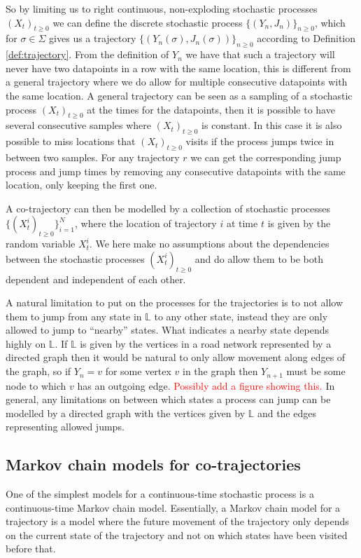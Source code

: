\documentclass[12pt]{article}
\newcommand{\todo}[1]{\textcolor{red}{#1}}
\newcommand{\traj}{r}
\newcommand{\locset}{\mathbb{L}}
\theoremstyle{definition}
\begin{document}
So by limiting us to right continuous, non-exploding stochastic
processes \((X_{t})_{t \geq 0}\) we can define the discrete stochastic
process \(\{(Y_{n}, J_{n})\}_{n \geq 0}\), which for
\(\sigma \in \Sigma\) gives us a trajectory
\(\{(Y_{n}(\sigma), J_{n}(\sigma))\}_{n \geq 0}\) according to
Definition \ref{def:trajectory}. From the definition of \(Y_{n}\) we
have that such a trajectory will never have two datapoints in a row
with the same location, this is different from a general trajectory
where we do allow for multiple consecutive datapoints with the same
location. A general trajectory can be seen as a sampling of a
stochastic process \((X_{t})_{t \geq 0}\) at the times for the
datapoints, then it is possible to have several consecutive samples
where \((X_{t})_{t \geq 0}\) is constant. In this case it is also
possible to miss locations that \((X_{t})_{t \geq 0}\) visits if the
process jumps twice in between two samples. For any trajectory
\(\traj\) we can get the corresponding jump process and jump times by
removing any consecutive datapoints with the same location, only
keeping the first one.

A co-trajectory can then be modelled by a collection of stochastic
processes \(\{(X_{t}^{i})_{t \geq 0}\}_{i = 1}^{N}\), where the
location of trajectory \(i\) at time \(t\) is given by the random
variable \(X_{t}^{i}\). We here make no assumptions about the
dependencies between the stochastic processes
\((X_{t}^{i})_{t \geq 0}\) and do allow them to be both dependent and
independent of each other.

A natural limitation to put on the processes for the trajectories is
to not allow them to jump from any state in \(\locset\) to any other
state, instead they are only allowed to jump to ``nearby'' states.
What indicates a nearby state depends highly on \(\locset\). If
\(\locset\) is given by the vertices in a road network represented by
a directed graph then it would be natural to only allow movement along
edges of the graph, so if \(Y_{n} = v\) for some vertex \(v\) in the
graph then \(Y_{n + 1}\) must be some node to which \(v\) has an
outgoing edge. \todo{Possibly add a figure showing this.} In general,
any limitations on between which states a process can jump can be
modelled by a directed graph with the vertices given by \(\locset\)
and the edges representing allowed jumps.

\subsection{Markov chain models for co-trajectories}
One of the simplest models for a continuous-time stochastic process is
a continuous-time Markov chain model. Essentially, a Markov chain
model for a trajectory is a model where the future movement of the
trajectory only depends on the current state of the trajectory and not
on which states have been visited before that.
\end{document}

